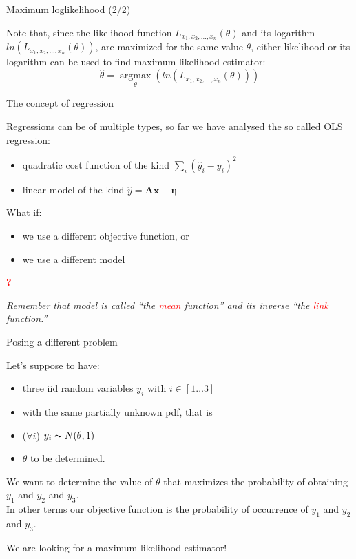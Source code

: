 \documentclass{beamer}
\DeclareMathOperator*{\argmax}{argmax}
\begin{document}
\begin{frame}
{\centerline{Maximum loglikelihood (2/2)}}
Note that, since the likelihood function $L_{x_1,x_2,...,x_n}(\theta)$ and its logarithm $ln(L_{x_1,x_2,...,x_n}(\theta))$, are maximized for the same value $\theta$, either likelihood or its logarithm can be used to find maximum likelihood estimator:
$$\hat{\theta} = \argmax\limits_{\theta}(ln(L_{x_1,x_2,...,x_n}(\theta)))$$
\end{frame}

\begin{frame}
{\centerline{The concept of regression}}

Regressions can be of multiple types, so far we have analysed the so called OLS regression:
\begin{itemize}
\item quadratic cost function of the kind $\sum_i (\hat{y}_i - y_i)^2$
\item linear model of the kind $\hat{y} =  \mathbf{A} \mathbf{x} + \mathbf{\eta}$
\end{itemize}

\vspace*{1cm}
What if:
\begin{itemize}
\item we use a different objective function, or
\item we use a different model
\end{itemize}
\centerline{\textcolor{red}{\Huge \bf ?}}
\vspace*{1cm}
\textit{Remember that model is called ``the \textcolor{red}{mean} function'' and its inverse ``the \textcolor{red}{link} function.''}
\end{frame}

\begin{frame}
{\centerline{Posing a different problem}}
Let's suppose to have:
\begin{itemize}
\item three iid random variables $y_i$ with $ i \in [1 \ldots 3]$
\item with the same partially unknown pdf, that is
\item ($\forall i$) $y_i \thicksim N(\theta,1)$
\item $\theta$ to be determined.
\end{itemize}

We want to determine the value of $\theta$ that maximizes the probability of obtaining $y_1$ and $y_2$ and $y_3$.\\

\vspace*{0.5cm}
In other terms our objective function is the probability of occurrence of $y_1$ and $y_2$ and $y_3$.

\vspace*{0.5cm}
We are looking for a maximum likelihood estimator!

\end{frame}
\end{document}
